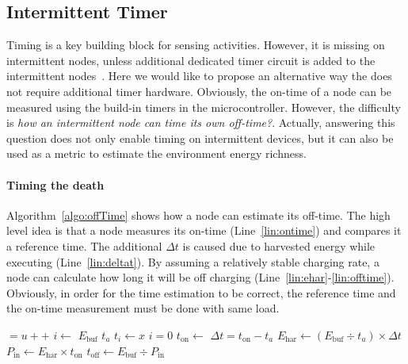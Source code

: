 \subsection{Intermittent Timer}
\label{subsec:interTimer}
Timing is a key building block for sensing activities. However, it is missing on intermittent nodes, unless additional dedicated timer circuit is added to the intermittent nodes~\cite{hester2017timely}. Here we would like to propose an alternative way the does not require additional timer hardware. Obviously, the on-time of a node can be measured using the build-in timers in the microcontroller. However, the difficulty is \textit{how an intermittent node can time its own off-time?}. Actually, answering this question does not only enable timing on intermittent devices, but it can also be used as a metric to estimate the environment energy richness. 

\paragraph{Timing the death} 
Algorithm~\ref{algo:offTime} shows how a node can estimate its off-time. The high level idea is that a node measures its on-time (Line~\ref{lin:ontime}) and compares it a reference time. The additional $\Delta{t}$ is caused due to harvested energy while executing (Line~\ref{lin:deltat}). By assuming a relatively stable charging rate, a node can calculate how long it will be off charging (Line~\ref{lin:ehar}-\ref{lin:offtime}). Obviously, in order for the time estimation to be correct, the reference time and the on-time measurement must be done with same load.
\begin{algorithm}[t]
    \label{algo:offTime}
    \small
    \begin{algorithmic}[1]
		\State {} $= u{+}{+}$ 
		\State $i \leftarrow $  
		\State $E_\text{buf}$ 
		\State $t_a$ 
		\State$ t_{i} \leftarrow x $ 
		    \State $i=0$
			\State {} 
			\State \label{lin:ontime} $t_\text{on} \leftarrow$  
		\EndIf
			\State \label{lin:deltat}$\Delta{t} = t_\text{on}-t_a$  
			\State \label{lin:ehar}$E_\text{har} \leftarrow (E_\text{buf}\div t_a)\times\Delta{t}$ 
			\State $P_\text{in} \leftarrow E_\text{har}\times{t_\text{on}}$ 
			\State \label{lin:offtime}$t_\text{off} \leftarrow E_\text{buf}\div P_\text{in}$
		\EndIf
	\end{algorithmic}
\end{algorithm}

